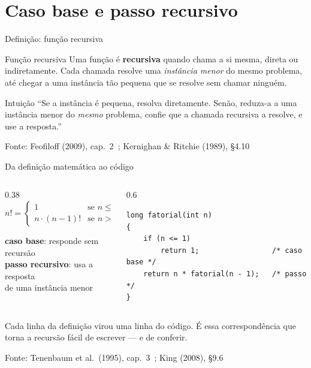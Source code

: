 \documentclass[aspectratio=169]{beamer}
\newcommand{\fonte}[1]{\vfill\hfill{\scriptsize\textcolor{UFSGray}{Fonte: #1}}}
\begin{document}
\section{Caso base e passo recursivo}

\begin{frame}{Definição: função recursiva}
  \begin{block}{Função recursiva}
    Uma função é \textbf{recursiva} quando chama a si mesma, direta ou
    indiretamente. Cada chamada resolve uma \emph{instância menor} do mesmo
    problema, até chegar a uma instância tão pequena que se resolve sem
    chamar ninguém.
  \end{block}
  \begin{exampleblock}{Intuição}
    ``Se a instância é pequena, resolva diretamente. Senão, reduza-a a uma
    instância menor do \emph{mesmo} problema, confie que a chamada recursiva
    a resolve, e use a resposta.''
  \end{exampleblock}
  \fonte{Feofiloff (2009), cap.~2~\cite{feofiloff2009algoritmos};
    Kernighan \& Ritchie (1989), §4.10~\cite{kernighan1989c}}
\end{frame}

\begin{frame}[fragile]{Da definição matemática ao código}
  \begin{columns}[c]
    \begin{column}{0.38\textwidth}
      \[
        n! =
        \begin{cases}
          1 & \text{se } n \le 1\\[0.3em]
          n \cdot (n-1)! & \text{se } n > 1
        \end{cases}
      \]
      \begin{center}
        \scriptsize
        \textcolor{UFSRed}{\textbf{caso base}}: responde sem recursão\\
        \textcolor{UFSBlue}{\textbf{passo recursivo}}: usa a resposta\\
        de uma instância menor
      \end{center}
    \end{column}
    \begin{column}{0.6\textwidth}
\begin{lstlisting}[style=tinyC]
long fatorial(int n)
{
    if (n <= 1)
        return 1;                 /* caso base */
    return n * fatorial(n - 1);   /* passo     */
}
\end{lstlisting}
    \end{column}
  \end{columns}
  \begin{block}{}
    \small Cada linha da definição virou uma linha do código. É essa
    correspondência que torna a recursão fácil de escrever --- e de
    conferir.
  \end{block}
  \fonte{Tenenbaum et al.\ (1995), cap.~3~\cite{tenenbaum1995estruturas};
    King (2008), §9.6~\cite{king2008c}}
\end{frame}
\end{document}

